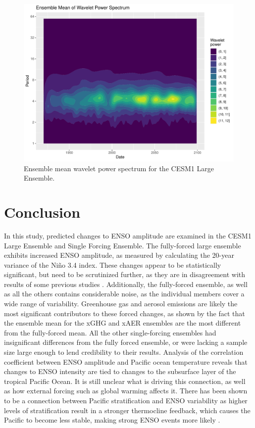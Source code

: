 \documentclass[11pt]{article}
\begin{document}
\begin{figure}[htbp]
\centering
\includegraphics[width=.9\linewidth]{../../data/figures/spectrum1.pdf}
\caption{\label{fig:wavelet_1}Ensemble mean wavelet power spectrum for the CESM1 Large Ensemble.}
\end{figure}

\section{Conclusion}
\label{sec:org0359a03}

In this study, predicted changes to ENSO amplitude are examined in the CESM1 Large Ensemble and Single Forcing Ensemble. The fully-forced large ensemble exhibits increased ENSO amplitude, as measured by calculating the 20-year variance of the Niño 3.4 index. These changes appear to be statistically significant, but need to be scrutinized further, as they are in disagreement with results of some previous studies \citep{stevenson2012significant}. Additionally, the fully-forced ensemble, as well as all the others contains considerable noise, as the individual members cover a wide range of variability. Greenhouse gas and aerosol emissions are likely the most significant contributors to these forced changes, as shown by the fact that the ensemble mean for the xGHG and xAER ensembles are the most different from the fully-forced mean. All the other single-forcing ensembles had insignificant differences from the fully forced ensemble, or were lacking a sample size large enough to lend credibility to their results. Analysis of the correlation coefficient between ENSO amplitude and Pacific ocean temperature reveals that changes to ENSO intensity are tied to changes to the subsurface layer of the tropical Pacific Ocean. It is still unclear what is driving this connection, as well as how external forcing such as global warming affects it. There has been shown to be a connection between Pacific stratification and ENSO variability as higher levels of stratification result in a stronger thermocline feedback, which causes the Pacific to become less stable, making strong ENSO events more likely \citep{dewitte2012reinterpreting}.
\end{document}
